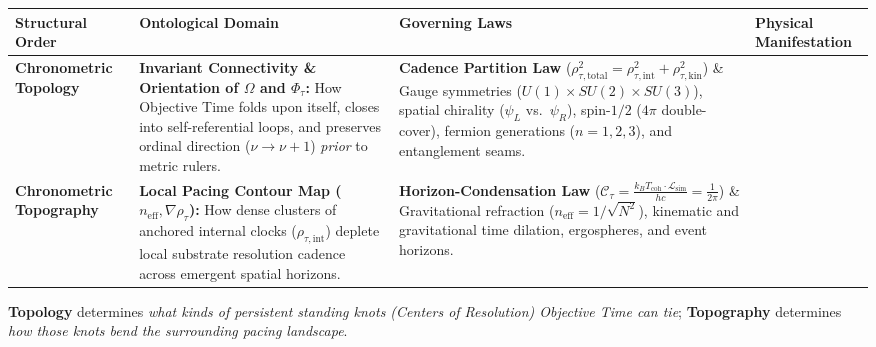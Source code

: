 \documentclass[
]{article}
\newcounter{none} %
\begin{document}
{\def\LTcaptype{none} %
\begin{longtable}[]{@{}
  >{\raggedright\arraybackslash}p{}
  >{\raggedright\arraybackslash}p{}
  >{\raggedright\arraybackslash}p{}
  >{\raggedright\arraybackslash}p{}@{}}
\toprule\noalign{}
\begin{minipage}[b]{\linewidth}\raggedright
Structural Order
\end{minipage} & \begin{minipage}[b]{\linewidth}\raggedright
Ontological Domain
\end{minipage} & \begin{minipage}[b]{\linewidth}\raggedright
Governing Laws
\end{minipage} & \begin{minipage}[b]{\linewidth}\raggedright
Physical Manifestation
\end{minipage} \\
\midrule\noalign{}
\endhead
\bottomrule\noalign{}
\endlastfoot
\textbf{Chronometric Topology} & \textbf{Invariant Connectivity \&
Orientation of \(\Omega\) and \(\Phi_\tau\):} How Objective Time folds
upon itself, closes into self-referential loops, and preserves ordinal
direction (\(\nu \to \nu + 1\)) \emph{prior} to metric rulers. &
\textbf{Cadence Partition Law}
(\(\rho_{\tau,\text{total}}^2 = \rho_{\tau,\text{int}}^2 + \rho_{\tau,\text{kin}}^2\))
\& Gauge symmetries (\(U(1) \times SU(2) \times SU(3)\)), spatial
chirality (\(\psi_L\) vs.~\(\psi_R\)), spin-\(1/2\) (\(4\pi\)
double-cover), fermion generations (\(n = 1, 2, 3\)), and entanglement
seams. & \\
\textbf{Chronometric Topography} & \textbf{Local Pacing Contour Map
(\(n_{\text{eff}}, \nabla\rho_\tau\)):} How dense clusters of anchored
internal clocks (\(\rho_{\tau,\text{int}}\)) deplete local substrate
resolution cadence across emergent spatial horizons. &
\textbf{Horizon-Condensation Law}
(\(\mathcal{C}_\tau = \frac{k_B T_{\text{coh}} \cdot \mathcal{L}_{\text{sim}}}{h c} = \frac{1}{2\pi}\))
\& Gravitational refraction (\(n_{\text{eff}} = 1/\sqrt{N^2}\)),
kinematic and gravitational time dilation, ergospheres, and event
horizons. & \\
\end{longtable}
}

\textbf{Topology} determines \emph{what kinds of persistent standing
knots (Centers of Resolution) Objective Time can tie};
\textbf{Topography} determines \emph{how those knots bend the
surrounding pacing landscape}.
\end{document}
